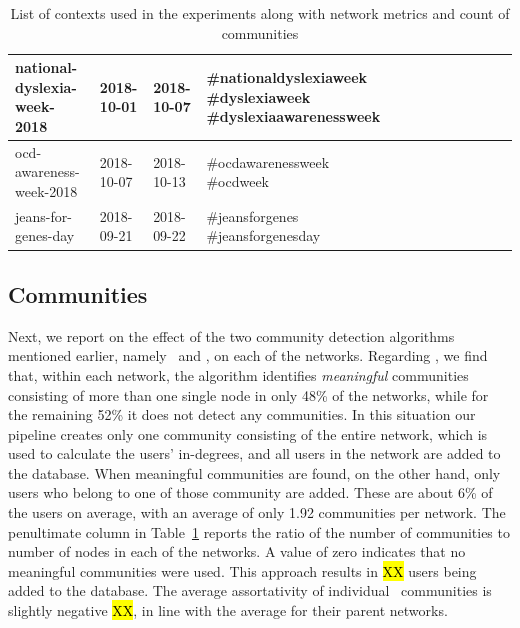 \documentclass[runningheads]{llncs}
\begin{document}
\begin{table}
{\begin{tabularx}{\textwidth}{|X|X|X|X|X|X|X|X|X|X|X|X|}
			\hline 
			\rule[-1ex]{0pt}{2.5ex}  national-dyslexia-week-2018          & 2018-10-01  & 2018-10-07 & \#nationaldyslexiaweek \#dyslexiaweek \#dyslexiaawarenessweek               & & & & & \\ 
			\hline 
			\rule[-1ex]{0pt}{2.5ex}  ocd-awareness-week-2018              & 2018-10-07  & 2018-10-13 & \#ocdawarenessweek \#ocdweek         & & & & & \\ 
			\hline 
			\rule[-1ex]{0pt}{2.5ex}  jeans-for-genes-day                  & 2018-09-21  & 2018-09-22 & \#jeansforgenes \#jeansforgenesday           & & & & & \\ 
			\hline 
	\end{tabularx}
	}
	
	\caption{List of contexts used in the experiments along with network metrics and count of \demon communities}
	\label{tab:contexts}
\end{table}	 

\subsection{Communities}  \label{sec:communities}

Next, we report on the effect of the two community detection algorithms mentioned earlier, namely \demon~and \infomap, on each of the networks. 
%
Regarding \demon, we find that, within each network, the algorithm  identifies \textit{meaningful} communities consisting of more than one single node in only 48\% of the networks, while for the remaining 52\% 
it does not detect any communities.
In this situation our pipeline creates only one community consisting of the entire network, which is used to calculate the users' in-degrees, and all users in the network are added to the database.
%
When meaningful communities are found, on the other hand, only users who belong to one of those community are added. 
These are about  6\% of the users on average, with an average of only 1.92 communities per network.
The penultimate column in Table~\ref{tab:contexts} reports the ratio of the number of communities to number of nodes in each of the networks. 
A value of zero indicates that no meaningful communities were used.
%
This approach results in \hl{XX} users being added to the database.
The average assortativity of individual \demon~communities is slightly negative \hl{XX}, in line with the average for their parent networks.
\end{document}
